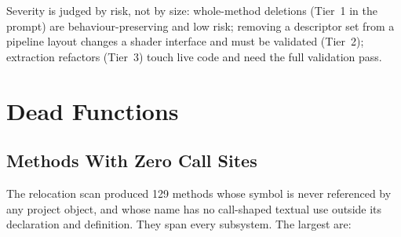 \documentclass[11pt,a4paper]{article}
\begin{document}
Severity is judged by risk, not by size: whole-method deletions (Tier~1 in the
prompt) are behaviour-preserving and low risk; removing a descriptor set from
a pipeline layout changes a shader interface and must be validated
(Tier~2); extraction refactors (Tier~3) touch live code and need the full
validation pass.

\section{Dead Functions}
\label{sec:deadfuncs}

\subsection{Methods With Zero Call Sites}
\label{sec:zerocall}

The relocation scan produced 129 methods whose symbol is never referenced by
any project object, and whose name has no call-shaped textual use outside its
declaration and definition. They span every subsystem. The largest are:
\end{document}
